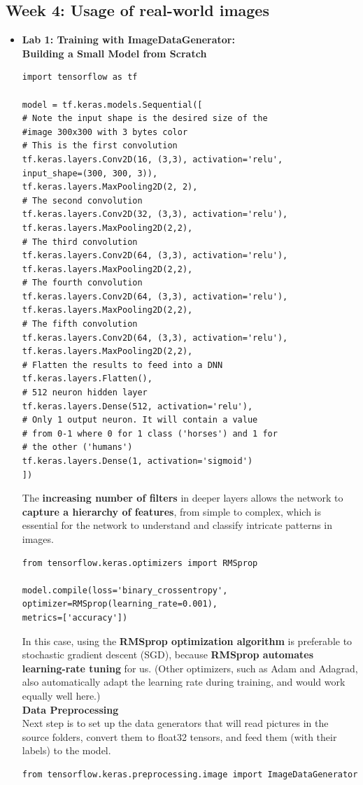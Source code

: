\documentclass[20pt]{article}
\begin{document}
	\subsection{Week 4: Usage of real-world images}
	\begin{itemize}
		\item \textbf{Lab 1: Training with ImageDataGenerator:}\\
		\textbf{Building a Small Model from Scratch}
		\begin{verbatim}
import tensorflow as tf

model = tf.keras.models.Sequential([
# Note the input shape is the desired size of the 
#image 300x300 with 3 bytes color
# This is the first convolution
tf.keras.layers.Conv2D(16, (3,3), activation='relu',
input_shape=(300, 300, 3)),
tf.keras.layers.MaxPooling2D(2, 2),
# The second convolution
tf.keras.layers.Conv2D(32, (3,3), activation='relu'),
tf.keras.layers.MaxPooling2D(2,2),
# The third convolution
tf.keras.layers.Conv2D(64, (3,3), activation='relu'),
tf.keras.layers.MaxPooling2D(2,2),
# The fourth convolution
tf.keras.layers.Conv2D(64, (3,3), activation='relu'),
tf.keras.layers.MaxPooling2D(2,2),
# The fifth convolution
tf.keras.layers.Conv2D(64, (3,3), activation='relu'),
tf.keras.layers.MaxPooling2D(2,2),
# Flatten the results to feed into a DNN
tf.keras.layers.Flatten(),
# 512 neuron hidden layer
tf.keras.layers.Dense(512, activation='relu'),
# Only 1 output neuron. It will contain a value
# from 0-1 where 0 for 1 class ('horses') and 1 for
# the other ('humans')
tf.keras.layers.Dense(1, activation='sigmoid')
])
		\end{verbatim}
		The \textbf{increasing number of filters} in deeper layers allows the network to \textbf{capture a hierarchy of features}, from simple to complex, which is essential for the network to understand and classify intricate patterns in images.
		\begin{verbatim}
from tensorflow.keras.optimizers import RMSprop
	
model.compile(loss='binary_crossentropy',
optimizer=RMSprop(learning_rate=0.001),
metrics=['accuracy'])
		\end{verbatim}
		In this case, using the \textbf{RMSprop optimization algorithm} is preferable to stochastic gradient descent (SGD), because \textbf{RMSprop automates learning-rate tuning} for us. (Other optimizers, such as Adam and Adagrad, also automatically adapt the learning rate during training, and would work equally well here.)\\
		\textbf{Data Preprocessing}\\
		Next step is to set up the data generators that will read pictures in the source folders, convert them to float32 tensors, and feed them (with their labels) to the model.
		\begin{verbatim}
from tensorflow.keras.preprocessing.image import ImageDataGenerator


\end{verbatim}
\end{itemize}
\end{document}
